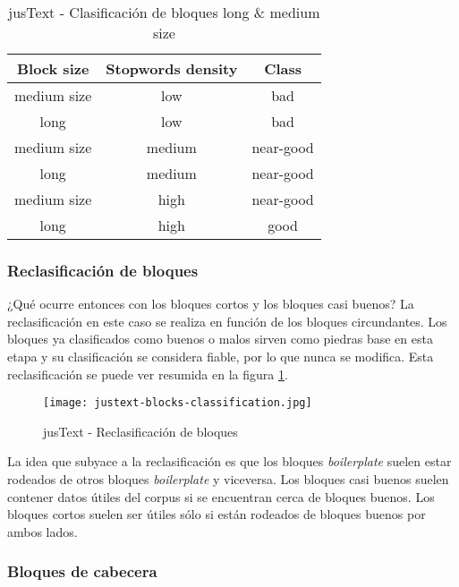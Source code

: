 \begin{table}[h]
  \begin{center}
  \begin{tabular}{| c | c | c |}
  \hline \textbf{Block size} & \textbf{Stopwords density} & \textbf{Class} \\ \hline
  medium size & low & bad \\ \hline
  long & low & bad \\ \hline
  medium size & medium & near-good \\ \hline
  long & medium & near-good \\ \hline
  medium size & high & near-good \\ \hline
  long & high & good \\ \hline
  \end{tabular}
  \caption{jusText - Clasificación de bloques long \& medium size}
  \label{tab:justext - clasificacion de bloques long & medium size}
  \end{center}
\end{table}

\subsubsection{Reclasificación de bloques}
\label{subsubsec:reclasificacion de bloques}

¿Qué ocurre entonces con los bloques cortos y los bloques casi buenos? La reclasificación en este caso se 
realiza en función de los bloques circundantes. Los bloques ya clasificados como buenos o malos sirven 
como piedras base en esta etapa y su clasificación se considera fiable, por lo que nunca se modifica. Esta 
reclasificación se puede ver resumida en la figura \ref{img:justext - reclasificacion de bloques}.

\begin{figure}[tphb]
  \centering
  \texttt{[image: justext-blocks-classification.jpg]}
  \caption{jusText - Reclasificación de bloques}
  \label{img:justext - reclasificacion de bloques}
\end{figure}

La idea que subyace a la reclasificación es que los bloques \emph{boilerplate} suelen estar rodeados de 
otros bloques \emph{boilerplate} y viceversa. Los bloques casi buenos suelen contener datos útiles del 
corpus si se encuentran cerca de bloques buenos. Los bloques cortos suelen ser útiles sólo si están rodeados 
de bloques buenos por ambos lados.

\subsubsection{Bloques de cabecera}
\label{subsubsec:bloques de cabecera}

